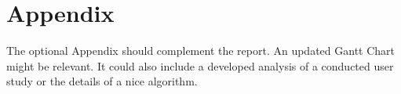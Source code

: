 \documentclass{article}
\begin{document}
\appendix

\section{Appendix}
The optional Appendix should complement the report. An updated Gantt Chart might be relevant. It could also include a developed analysis of a conducted user study or the details of a nice algorithm. 



\end{document}
